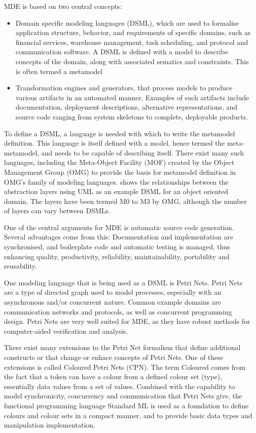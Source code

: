 MDE is based on two central concepts:
\begin{itemize}
	\item Domain specific modeling languages (DSML), which are used to formalise
	application structure, behavior, and requirements of specific domains, such as
	financial services, warehouse management, task scheduling, and protocol and
	communication software. A DSML is defined with a model to describe concepts
	of the domain, along with associated sematics and constraints. This is often
	termed a metamodel
	\item Transformation engines and generators, that process models to produce
	various artifacts in an automated manner. Examples of such
	artifacts include documentation, deployment descriptions, alternative
	representations, and source code ranging from system skeletons to complete,
	deployable products.
\end{itemize}

To define a DSML, a language is needed with which to write the
metamodel definition. This language is itself defined with a model, hence termed
the meta-metamodel, and needs to be capable of describing itself. There exist many such
languages, including the Meta-Object Facility (MOF) \cite{} created by the
Object Management Group (OMG) to provide the basis for metamodel definition in
OMG’s family of modeling languages. 
shows the relationships between the abstraction layers using UML as an example
DSML for an object oriented domain. The layers have been termed
M0 to M3 by OMG, although the number of layers can vary between DSMLs.


One of the central arguments for MDE is automatic source code generation.
Several advantages come from this:  Documentation and
implementation are synchronised, and boilerplate code and automatic testing is
managed, thus enhancing quality, productivity, reliability, maintainability,
portability and reusability.

One modeling language that is being used as a DSML is Petri Nets. 
Petri Nets are a type of directed graph used to model processes,
especially with an asynchronous and/or concurrent nature. Common
example domains are communication networks and protocols, as
well as concurrent programming design.
Petri Nets are very well suited for MDE, as they have robust methods for
computer-aided verification and analysis. 

There exist many extensions to the Petri Net formalism that define additional
constructs or that change or enhace concepts of Petri Nets. One of these
extensions is called Coloured Petri Nets (CPN). The term Coloured comes from
the fact that a token can have a colour from a defined colour set (type),
essentially data values from a set of values. Combined with the capability to
model synchronicity, concurrency and communication that Petri Nets give, the
functional programming language Standard ML \cite{milner1997definition} is used
as a foundation to define colours and colour sets in a compact manner, and to
provide basic data types and manipulation implementation.

